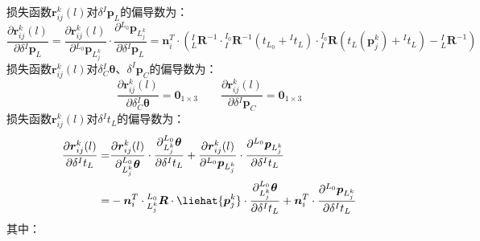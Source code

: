 损失函数$\boldsymbol{r}_{ij}^k(l)$对$\delta{^{I}\boldsymbol{p}_L}$的偏导数为：
\begin{equation}
  \label{equ:jacobian_pli}
  \frac{\partial \boldsymbol{r}_{ij}^k(l)}{\partial \delta {^{I}\boldsymbol{p}_L}}=
  \frac{\partial \boldsymbol{r}_{ij}^k(l)}{\partial {^{L_0}\boldsymbol{p}_{L_j^k}}}\cdot
  \frac{\partial {^{L_0}\boldsymbol{p}_{L_j^k}}}{\partial \delta {^{I}\boldsymbol{p}_L}}=
  \boldsymbol{n}_i^T\cdot
  \left(
  {{^{I}_{L}}\boldsymbol{R}^{-1}}\cdot{{^{I_0}_{I}}\boldsymbol{R}^{-1}\left( t_{L_0}+{^{I}t_L}\right) }\cdot{{^{I_0}_{I}}\boldsymbol{R}\left( t_{L}(\boldsymbol{p}_j^k)+{^{I}t_L}\right) }-{{^{I}_{L}}\boldsymbol{R}^{-1}}
  \right)
\end{equation}
损失函数$\boldsymbol{r}_{ij}^k(l)$对$\delta{^{I}_{C}\boldsymbol{\theta}}$、${\delta^{I}\boldsymbol{p}_C}$的偏导数为：
\begin{equation}
  \frac{\partial \boldsymbol{r}_{ij}^k(l)}{\partial \delta {^{I}_{C}\boldsymbol{\theta}}}=\boldsymbol{0}_{1\times 3}
  \quad\quad
  \frac{\partial \boldsymbol{r}_{ij}^k(l)}{\partial \delta {^{I}\boldsymbol{p}_C}}=\boldsymbol{0}_{1\times 3}
\end{equation}
损失函数$\boldsymbol{r}_{ij}^k(l)$对$\delta{^{I}t_{L}}$的偏导数为：
\begin{equation}
  \begin{aligned}
    \label{equ:jacobian_tli}
    \frac{\partial \boldsymbol{r}_{ij}^k(l)}{\partial \delta {^{I}t_{L}}}= &
    \frac{\partial \boldsymbol{r}_{ij}^k(l)}{\partial  {^{L_0}_{L_j^k}\boldsymbol{\theta}}}\cdot
    \frac{\partial {^{L_0}_{L_j^k}\boldsymbol{\theta}}}{\partial \delta{^{I}t_{L}}}
    +
    \frac{\partial \boldsymbol{r}_{ij}^k(l)}{\partial {^{L_0}\boldsymbol{p}_{L_j^k}}}\cdot
    \frac{\partial {^{L_0}\boldsymbol{p}_{L_j^k}}}{\partial \delta {^{I}t_{L}}}
    \\
    =                                                                      & -\boldsymbol{n}_i^T\cdot{^{L_0}_{L_j^k}\boldsymbol{R}\cdot\liehat{\boldsymbol{p}_j^k}}\cdot
    \frac{\partial {^{L_0}_{L_j^k}\boldsymbol{\theta}}}{\partial \delta{^{I}t_{L}}}
    +
    \boldsymbol{n}_i^T\cdot\frac{\partial {^{L_0}\boldsymbol{p}_{L_j^k}}}{\partial \delta {^{I}t_{L}}}
  \end{aligned}
\end{equation}
其中：
